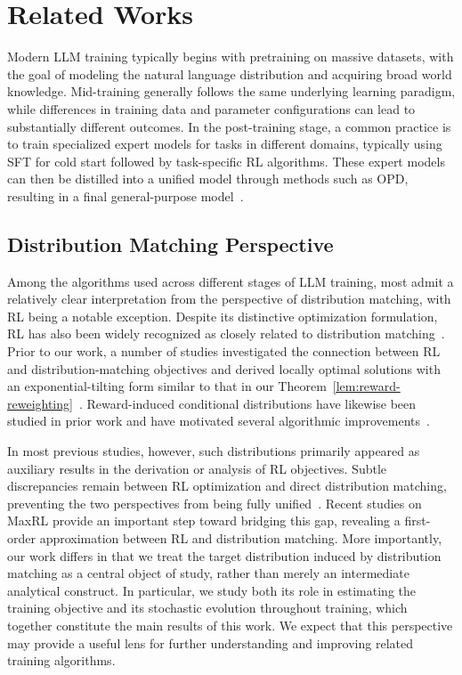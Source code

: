 \section{Related Works}

Modern LLM training typically begins with pretraining on massive datasets, with the goal of modeling the natural language distribution and acquiring broad world knowledge. Mid-training generally follows the same underlying learning paradigm, while differences in training data and parameter configurations can lead to substantially different outcomes. In the post-training stage, a common practice is to train specialized expert models for tasks in different domains, typically using SFT for cold start followed by task-specific RL algorithms. These expert models can then be distilled into a unified model through methods such as OPD, resulting in a final general-purpose model~\citep{deepseek-ai_deepseek-v4_2026, team_kimi_2026, glm-5-team_glm-5_2026}.

\subsection{Distribution Matching Perspective}

Among the algorithms used across different stages of LLM training, most admit a relatively clear interpretation from the perspective of distribution matching, with RL being a notable exception. Despite its distinctive optimization formulation, RL has also been widely recognized as closely related to distribution matching~\citep{korbak_reinforcement_2022}. Prior to our work, a number of studies investigated the connection between RL and distribution-matching objectives and derived locally optimal solutions with an exponential-tilting form similar to that in our Theorem~\ref{lem:reward-reweighting}~\citep{korbak_rl_2022, korbak_reinforcement_2022}. Reward-induced conditional distributions have likewise been studied in prior work and have motivated several algorithmic improvements~\citep{tajwar_maximum_2026, zhou_variational_2025}.

In most previous studies, however, such distributions primarily appeared as auxiliary results in the derivation or analysis of RL objectives. Subtle discrepancies remain between RL optimization and direct distribution matching, preventing the two perspectives from being fully unified~\citep{korbak_reinforcement_2022}. Recent studies on MaxRL provide an important step toward bridging this gap, revealing a first-order approximation between RL and distribution matching. More importantly, our work differs in that we treat the target distribution induced by distribution matching as a central object of study, rather than merely an intermediate analytical construct. In particular, we study both its role in estimating the training objective and its stochastic evolution throughout training, which together constitute the main results of this work. We expect that this perspective may provide a useful lens for further understanding and improving related training algorithms.

